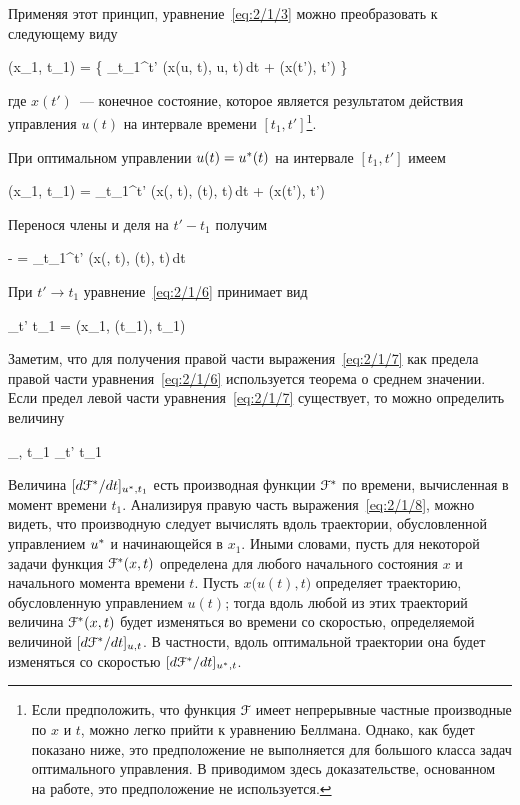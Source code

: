 Применяя этот принцип, уравнение~\ref{eq:2/1/3} можно преобразовать к следующему виду

    \optF(x_1, t_1) =  \biggl\{ \int\limits_{t_1}^{t'} \funcL\bigl(x(u, t), u, t\bigr)\,dt + \optF\bigl(x(t'), t'\bigr) \biggr\} \text{,}
\eeq

где $x(t')$~--- конечное состояние, которое является результатом действия управления $u(t)$ на интервале времени $[t_1, t']$\footnote{ Если предположить, что функция $\mathcal{F}$ имеет непрерывные частные производные по $x$ и $t$, можно легко прийти к уравнению Беллмана\cite{BELLMAN1}. Однако, как будет показано ниже, это предположение не выполняется для большого класса задач оптимального управления. В приводимом здесь доказательстве, основанном на работе\cite{TCHAMRAN}, это предположение не используется. }.

При оптимальном управлении $u(t) = u^{*}(t)$ на интервале $[t_1, t']$ имеем

    \optF(x_1, t_1) = \int\limits_{t_1}^{t'} \funcL\bigl(x(\optU, t), \optU(t), t\bigr)\,dt + \optF\bigl(x(t'), t'\bigr) 
\eeq

Перенося члены и деля на $t' - t_1$ получим

    - =  \int\limits_{t_1}^{t'} \funcL\bigl(x(\optU, t), \optU(t), t\bigr)\,dt 
\eeq

При $t' \to t_1$ уравнение~\ref{eq:2/1/6} принимает вид

    \lim_{t' \to t_1}  = \funcL\bigl(x_1, \optU(t_1), t_1\bigr) 
\eeq

Заметим, что для получения правой части выражения~\ref{eq:2/1/7} как предела правой части уравнения~\ref{eq:2/1/6} используется теорема о среднем значении\cite{FICHTENGOLZ}. Если предел левой части уравнения~\ref{eq:2/1/7} существует, то можно определить величину

    _{\optU, t_1} \eqdef \lim_{t' \to t_1}  
\eeq

Величина $[ d \mathcal{F}^{*} / d t ]_{u^{*}, t_1}$ есть производная функции $\mathcal{F}^{*}$ по времени, вычисленная в момент времени $t_1$. Анализируя правую часть выражения~\ref{eq:2/1/8}, можно видеть, что производную следует вычислять вдоль траектории, обусловленной управлением $u^{*}$ и начинающейся в $x_1$. Иными словами, пусть для некоторой задачи функция $\mathcal{F}^{*}(x, t)$ определена для любого начального состояния $x$ и начального момента времени $t$. Пусть $x\bigl( u(t), t \bigr)$ определяет траекторию, обусловленную управлением $u(t)$; тогда вдоль любой из этих траекторий величина $\mathcal{F}^{*}(x, t)$ будет изменяться во времени со скоростью, определяемой величиной $[ d \mathcal{F}^{*} / d t ]_{u, t}$. В частности, вдоль оптимальной траектории она будет изменяться со скоростью $[ d \mathcal{F}^{*} / d t ]_{u^{*}, t}$.

